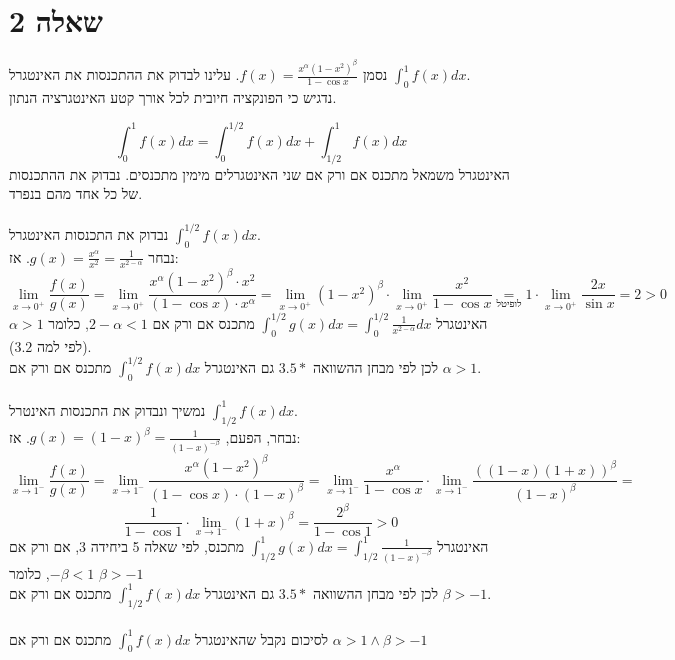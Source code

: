 \documentclass{article}
\newcommand\underrel[2]{\mathrel{\mathop{#2}\limits_{#1}}}
\begin{document}
\pagebreak

\section*{שאלה 2}

נסמן $f(x)=\frac{x^\alpha(1-x^2)^\beta}{1-\cos x}$.
עלינו לבדוק את ההתכנסות את האינטגרל $\int_0^1f(x)dx$. \\
נדגיש כי הפונקציה חיובית לכל אורך קטע האינטגרציה הנתון.

\[
    \int_0^1 f(x) dx = \int_0^{1/2}f(x)dx + \int_{1/2}^1f(x)dx
\]
האינטגרל משמאל מתכנס אם ורק אם שני האינטגרלים מימין מתכנסים. נבדוק את ההתכנסות של כל אחד מהם בנפרד.
\\\\
נבדוק את התכנסות האינטגרל $\int_0^{1/2}f(x)dx$. \\
נבחר $g(x) = \frac{x^\alpha}{x^2}=\frac{1}{x^{2-\alpha}}$. אז:
\[
    \lim_{x\rightarrow 0^+}\frac{f(x)}{g(x)} =
    \lim_{x\rightarrow 0^+}\frac{x^\alpha(1-x^2)^\beta \cdot x^2}{(1-\cos x)\cdot x^\alpha} =
    \lim_{x\rightarrow 0^+} (1-x^2)^\beta \cdot \lim_{x\rightarrow 0^+} \frac{x^2}{1-\cos x} \underrel{\text{לופיטל}}{=}
    1 \cdot \lim_{x\rightarrow 0^+} \frac{2x}{\sin x} = 2 > 0
\]
האינטגרל $\int_0^{1/2}g(x)dx=\int_0^{1/2}\frac{1}{x^{2-\alpha}}dx$
מתכנס אם ורק אם $2-\alpha < 1$,
כלומר $\alpha > 1$
(לפי למה $3.2$). \\
לכן לפי מבחן ההשוואה $3.5*$
גם האינטגרל $\int_0^{1/2}f(x)dx$
מתכנס אם ורק אם $\alpha > 1$.
\\\\
נמשיך ונבדוק את התכנסות האינטרל $\int_{1/2}^1f(x)dx$. \\
נבחר, הפעם, $g(x)=(1-x)^\beta=\frac{1}{(1-x)^{-\beta}}$. אז:
\[
    \lim_{x\rightarrow 1^-} \frac{f(x)}{g(x)} =
    \lim_{x\rightarrow 1^-} \frac{x^\alpha (1-x^2)^\beta}{(1-\cos x)\cdot (1-x)^\beta} =
    \lim_{x\rightarrow 1^-} \frac{x^\alpha}{1-\cos x} \cdot \lim_{x\rightarrow 1^-} \frac{((1-x)(1+x))^\beta}{(1-x)^\beta} =
\]
\[
    \frac{1}{1-\cos 1} \cdot \lim_{x\rightarrow 1^-} (1+x)^\beta =
    \frac{2^\beta}{1-\cos 1} > 0
\]
האינטגרל $\int_{1/2}^1g(x)dx = \int_{1/2}^1\frac{1}{(1-x)^{-\beta}}$
מתכנס, לפי שאלה 5 ביחידה 3, אם ורק אם $-\beta < 1$, כלומר $\beta > -1$ \\
לכן לפי מבחן ההשוואה $3.5*$
גם האינטגרל $\int_{1/2}^1f(x)dx$
מתכנס אם ורק אם $\beta > -1$.
\\\\
לסיכום נקבל שהאינטגרל $\int_0^1f(x)dx$
מתכנס אם ורק אם $\alpha > 1\wedge \beta > -1$
\end{document}
